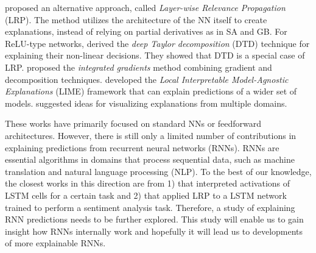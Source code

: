 \cite{BachPixelWiseExplanationsNonLinear2015} proposed an alternative approach, called \textit{Layer-wise Relevance Propagation} (LRP). The method utilizes the architecture of the NN itself to create explanations, instead of relying on partial derivatives as in SA and GB. For ReLU-type networks, \citet{MontavonExplainingnonlinearclassification2017} derived  the \textit{deep Taylor decomposition} (DTD) technique for explaining their non-linear decisions. They showed that DTD is a special case of LRP. \citet{SundararajanAxiomaticAttributionDeep2017a} proposed the \textit{integrated gradients} method combining gradient and decomposition techniques. \citet{RibeiroWhyShouldTrust2016} developed the \textit{Local Interpretable Model-Agnostic Explanations} (LIME) framework that can explain predictions of a wider set of models. \citet{OlahBuildingBlocksInterpretability2018} suggested ideas for visualizing explanations from multiple domains. 

These works have primarily focused on standard NNs or feedforward architectures. However, there is still only a limited number of contributions in explaining predictions from recurrent neural networks (RNNs). RNNs are essential algorithms in domains that process sequential data, such as machine translation and natural language processing (NLP). To the best of our knowledge, the closest works in this direction are from 1) \citet{KarpathyVisualizingUnderstandingRecurrent2015} that  interpreted activations of LSTM \citep{HochreiterLongshorttermmemory1997} cells for a certain task and 2) \citet{ArrasExplainingRecurrentNeural2017} that applied LRP to a LSTM network trained to perform a sentiment analysis task. Therefore, a study of explaining RNN predictions needs to be further explored. This study will enable us to gain insight how RNNs internally work and hopefully it will lead us to developments of more explainable RNNs.



%
%
%
%


